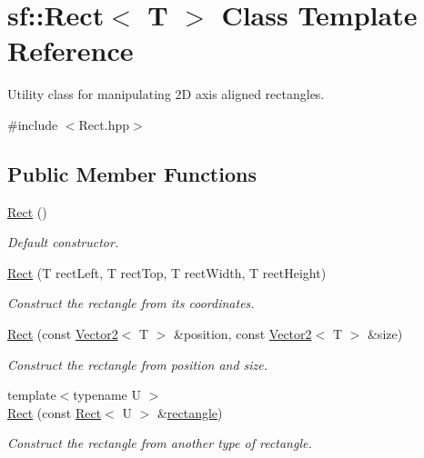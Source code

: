 \hypertarget{classsf_1_1_rect}{\section{sf\+:\+:Rect$<$ T $>$ Class Template Reference}
\label{classsf_1_1_rect}
}


Utility class for manipulating 2\+D axis aligned rectangles.  




{\ttfamily \#include $<$Rect.\+hpp$>$}

\subsection*{Public Member Functions}
\begin{DoxyCompactItemize}
\item 
\hyperlink{classsf_1_1_rect_a0f87ebaef9722a6222fd2e04ce8efb37}{Rect} ()
\begin{DoxyCompactList}\small\item\em Default constructor. \end{DoxyCompactList}\item 
\hyperlink{classsf_1_1_rect_a15cdbc5a1aed3a8fc7be1bd5004f19f9}{Rect} (T rect\+Left, T rect\+Top, T rect\+Width, T rect\+Height)
\begin{DoxyCompactList}\small\item\em Construct the rectangle from its coordinates. \end{DoxyCompactList}\item 
\hyperlink{classsf_1_1_rect_a27fdf85caa6d12caeeff78913cc59936}{Rect} (const \hyperlink{classsf_1_1_vector2}{Vector2}$<$ T $>$ \&position, const \hyperlink{classsf_1_1_vector2}{Vector2}$<$ T $>$ \&size)
\begin{DoxyCompactList}\small\item\em Construct the rectangle from position and size. \end{DoxyCompactList}\item 
{\footnotesize template$<$typename U $>$ }\\\hyperlink{classsf_1_1_rect_a6fff2bb7e93677839461a66bc2957de0}{Rect} (const \hyperlink{classsf_1_1_rect}{Rect}$<$ U $>$ \&\hyperlink{structrectangle}{rectangle})
\begin{DoxyCompactList}\small\item\em Construct the rectangle from another type of rectangle. \end{DoxyCompactList}\item 

\end{DoxyCompactItemize}
